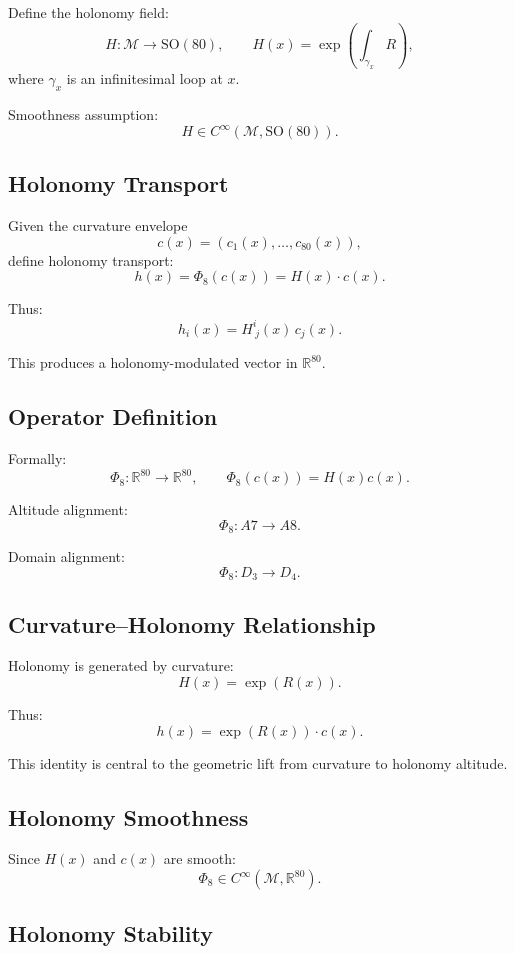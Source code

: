 Define the holonomy field:
\[
H : \mathcal{M} \to \mathrm{SO}(80),
\qquad
H(x) = \exp\!\left( \int_{\gamma_x} R \right),
\]
where $\gamma_x$ is an infinitesimal loop at $x$.

Smoothness assumption:
\[
H \in C^\infty(\mathcal{M}, \mathrm{SO}(80)).
\]

\subsection{Holonomy Transport}

Given the curvature envelope
\[
c(x) = (c_1(x), \dots, c_{80}(x)),
\]
define holonomy transport:
\[
h(x) = \Phi_8(c(x)) = H(x) \cdot c(x).
\]

Thus:
\[
h_i(x) = H^i_{\ j}(x) \, c_j(x).
\]

This produces a holonomy-modulated vector in $\mathbb{R}^{80}$.

\subsection{Operator Definition}

Formally:
\[
\Phi_8 : \mathbb{R}^{80} \to \mathbb{R}^{80},
\qquad
\Phi_8(c(x)) = H(x) c(x).
\]

Altitude alignment:
\[
\Phi_8 : A7 \to A8.
\]

Domain alignment:
\[
\Phi_8 : D_3 \to D_4.
\]

\subsection{Curvature–Holonomy Relationship}

Holonomy is generated by curvature:
\[
H(x) = \exp\!\left( R(x) \right).
\]

Thus:
\[
h(x) = \exp(R(x)) \cdot c(x).
\]

This identity is central to the geometric lift from curvature to holonomy
altitude.

\subsection{Holonomy Smoothness}

Since $H(x)$ and $c(x)$ are smooth:
\[
\Phi_8 \in C^\infty(\mathcal{M}, \mathbb{R}^{80}).
\]

\subsection{Holonomy Stability}

